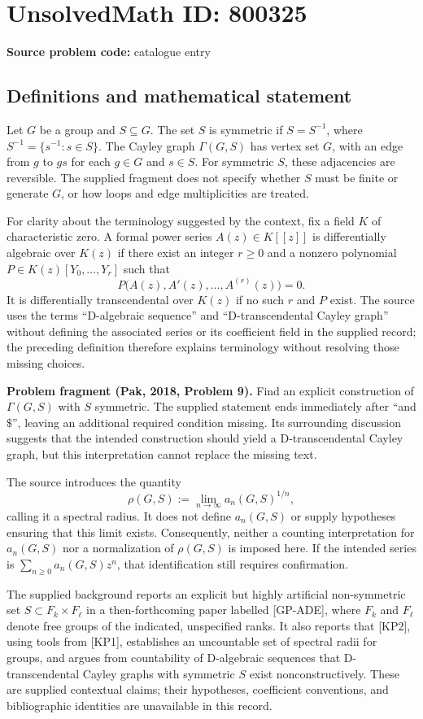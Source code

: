 \documentclass[11pt]{article}
\begin{document}
\section*{UnsolvedMath ID: 800325}
\textbf{Source problem code:} catalogue entry
\subsection{Definitions and mathematical statement}
Let \(G\) be a group and \(S\subseteq G\). The set \(S\) is symmetric if \(S=S^{-1}\), where \(S^{-1}=\{s^{-1}:s\in S\}\). The Cayley graph \(\Gamma(G,S)\) has vertex set \(G\), with an edge from \(g\) to \(gs\) for each \(g\in G\) and \(s\in S\). For symmetric \(S\), these adjacencies are reversible. The supplied fragment does not specify whether \(S\) must be finite or generate \(G\), or how loops and edge multiplicities are treated.

For clarity about the terminology suggested by the context, fix a field \(K\) of characteristic zero. A formal power series \(A(z)\in K[[z]]\) is differentially algebraic over \(K(z)\) if there exist an integer \(r\geq 0\) and a nonzero polynomial \(P\in K(z)[Y_0,\ldots,Y_r]\) such that
\[
P\bigl(A(z),A'(z),\ldots,A^{(r)}(z)\bigr)=0.
\]
It is differentially transcendental over \(K(z)\) if no such \(r\) and \(P\) exist. The source uses the terms ``D-algebraic sequence'' and ``D-transcendental Cayley graph'' without defining the associated series or its coefficient field in the supplied record; the preceding definition therefore explains terminology without resolving those missing choices.

\textbf{Problem fragment (Pak, 2018, Problem 9).} Find an explicit construction of \(\Gamma(G,S)\) with \(S\) symmetric. The supplied statement ends immediately after ``and \(\$\)'', leaving an additional required condition missing. Its surrounding discussion suggests that the intended construction should yield a D-transcendental Cayley graph, but this interpretation cannot replace the missing text.

The source introduces the quantity
\[
\rho(G,S):=\lim_{n\to\infty}a_n(G,S)^{1/n},
\]
calling it a spectral radius. It does not define \(a_n(G,S)\) or supply hypotheses ensuring that this limit exists. Consequently, neither a counting interpretation for \(a_n(G,S)\) nor a normalization of \(\rho(G,S)\) is imposed here. If the intended series is \(\sum_{n\geq0}a_n(G,S)z^n\), that identification still requires confirmation.

The supplied background reports an explicit but highly artificial non-symmetric set \(S\subset F_k\times F_\ell\) in a then-forthcoming paper labelled [GP-ADE], where \(F_k\) and \(F_\ell\) denote free groups of the indicated, unspecified ranks. It also reports that [KP2], using tools from [KP1], establishes an uncountable set of spectral radii for groups, and argues from countability of D-algebraic sequences that D-transcendental Cayley graphs with symmetric \(S\) exist nonconstructively. These are supplied contextual claims; their hypotheses, coefficient conventions, and bibliographic identities are unavailable in this record.
\end{document}
